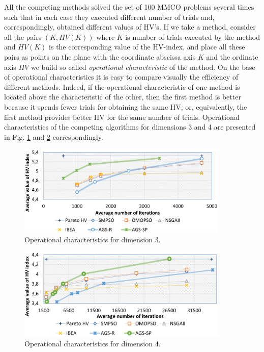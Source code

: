 \documentclass[runningheads]{llncs}
\begin{document}
All the competing methods solved the set of 100 MMCO problems several times such that in each case they executed different number of trials and, correspondingly, obtained different values of HV's. If we take a method, consider all the pairs $(K, HV(K))$ where $K$ is number of trials executed by the method and $HV(K)$ is the corresponding value of the HV-index, and place all these pairs as points on the plane with the coordinate abscissa axis $K$ and the ordinate axis $HV$ we build so called \textit{operational characteristic} \cite{Grishagin2016_2} of the method. On the base of operational characteristics it is easy to compare visually the efficiency of different methods. Indeed, if the operational characteristic of one method is located above the characteristic of the other, then the first method is better because it spends fewer trials for obtaining the same HV, or, equivalently, the first method provides better HV for the same number of trials. Operational characteristics of the competing algorithms for dimensions 3 and 4 are presented in Fig. \ref{fig:4} and \ref{fig:5} correspondingly.
 
\begin{figure}
\centering
\includegraphics[width=0.9\textwidth]{fig4}
\caption{Operational characteristics for dimension 3.} \label{fig:4}
\end{figure}

\begin{figure}
\centering
\includegraphics[width=0.9\textwidth]{fig5}
\caption{Operational characteristics for dimension 4.} \label{fig:5}
\end{figure}
\end{document}
